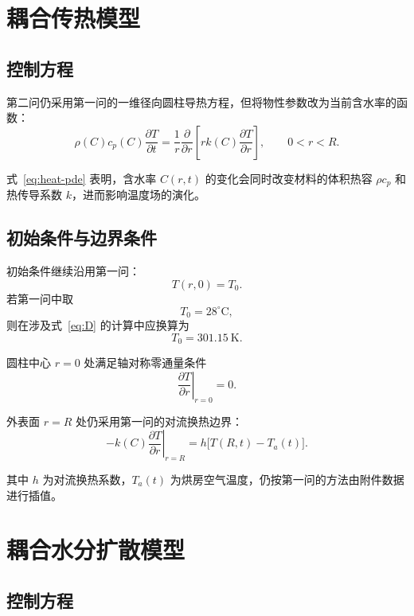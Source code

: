 \documentclass[UTF8,a4paper,12pt]{ctexart}
\begin{document}
\section{耦合传热模型}

\subsection{控制方程}

第二问仍采用第一问的一维径向圆柱导热方程，但将物性参数改为当前含水率的函数：
\begin{equation}
    \rho(C)c_p(C)\frac{\partial T}{\partial t}
    =
    \frac{1}{r}
    \frac{\partial}{\partial r}
    \left[
        rk(C)\frac{\partial T}{\partial r}
    \right],
    \qquad 0<r<R.
    \label{eq:heat-pde}
\end{equation}

式~\eqref{eq:heat-pde} 表明，含水率 $C(r,t)$ 的变化会同时改变材料的体积热容 $\rho c_p$ 和热传导系数 $k$，进而影响温度场的演化。

\subsection{初始条件与边界条件}

初始条件继续沿用第一问：
\begin{equation}
    T(r,0)=T_0.
\end{equation}
若第一问中取
\[
T_0=28^\circ\mathrm{C},
\]
则在涉及式~\eqref{eq:D} 的计算中应换算为
\[
T_0=301.15\ \mathrm{K}.
\]

圆柱中心 $r=0$ 处满足轴对称零通量条件
\begin{equation}
    \left.
    \frac{\partial T}{\partial r}
    \right|_{r=0}
    =0.
    \label{eq:heat-center}
\end{equation}

外表面 $r=R$ 处仍采用第一问的对流换热边界：
\begin{equation}
    -k(C)
    \left.
    \frac{\partial T}{\partial r}
    \right|_{r=R}
    =
    h\bigl[T(R,t)-T_a(t)\bigr].
    \label{eq:heat-surface}
\end{equation}

其中 $h$ 为对流换热系数，$T_a(t)$ 为烘房空气温度，仍按第一问的方法由附件数据进行插值。

\section{耦合水分扩散模型}

\subsection{控制方程}
\end{document}
